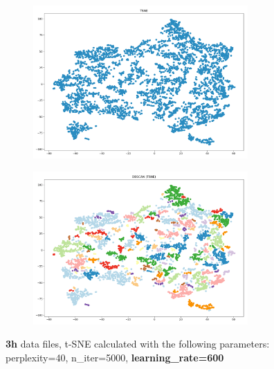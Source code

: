 \begin{figure}[H]
	\centering
	
  \centering
	\begin{subfigure}{.5\textwidth}
    \centering
    \includegraphics[width=0.9\textwidth]{./images/tsneParametersTest/learningRate/lr600-3hTSNE.png}
  \end{subfigure}%
  \begin{subfigure}{.5\textwidth}
    \centering
    \includegraphics[width=0.9\textwidth]{./images/tsneParametersTest/learningRate/lr600-3hDBSCAN.png}
	\end{subfigure}
	\caption{\textbf{3h} data files, t-SNE calculated with the following parameters: perplexity=40, n\_iter=5000, \textbf{learning\_rate=600}}
  \label{figure:3hlr600TSNE}
\end{figure}




